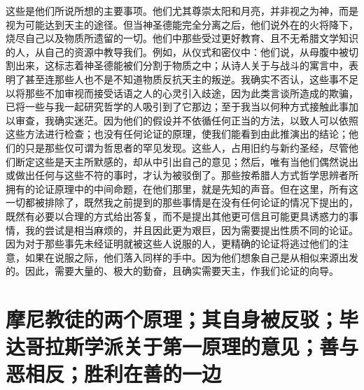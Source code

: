 这些是他们所说所想的主要事项。他们尤其尊崇太阳和月亮，并非视之为神，而是视为可能达到天主的途径。但当神圣德能完全分离之后，他们说外在的火将降下，烧尽自己以及物质所遗留的一切。他们中那些受过更好教育、且不无希腊文学知识的人，从自己的资源中教导我们。例如，从仪式和密仪中：他们说，从母腹中被切割出来，这标志着神圣德能被们分割于物质之中；从诗人关于与战斗的寓言中，表明了甚至连那些人也不是不知道物质反抗天主的叛逆。我确实不否认，这些事不足以将那些不加审视而接受话语之人的心灵引入歧途，因为此类言谈所造成的欺骗，已将一些与我一起研究哲学的人吸引到了它那边；至于我当以何种方式接触此事加以审查，我确实迷茫。因为他们的假设并不依循任何正当的方法，以致人可以依照这些方法进行检查；也没有任何论证的原理，使我们能看到由此推演出的结论；他们的只是那些仅可谓为哲思者的罕见发现。这些人，占用旧约与新约圣经，尽管他们断定这些是天主所默感的，却从中引出自己的意见；然后，唯有当他们偶然说出或做出任何与这些不符的事时，才认为被驳倒了。那些按希腊人方式哲学思辨者所拥有的论证原理中的中间命题，在他们那里，就是先知的声音。但在这里，所有这一切都被排除了，既然我之前提到的那些事情是在没有任何论证的情况下提出的，既然有必要以合理的方式给出答复，而不是提出其他更可信且可能更具诱惑力的事情，我的尝试是相当麻烦的，并且因此更为艰巨，因为需要提出性质不同的论证。因为对于那些事先未经证明就被这些人说服的人，更精确的论证将逃过他们的注意，如果在说服之际，他们落入同样的手中。因为他们想象自己是从相似来源出发的。因此，需要大量的、极大的勤奋，且确实需要天主，作我们论证的向导。\par


\section{摩尼教徒的两个原理；其自身被反驳；毕达哥拉斯学派关于第一原理的意见；善与恶相反；胜利在善的一边}

